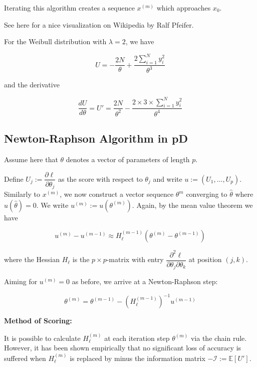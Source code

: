 \documentclass[11pt]{article}
\begin{document}
Iterating this algorithm creates a sequence \(x^{(m)}\) which approaches \(x_0\).

See here for a nice visualization on Wikipedia by Ralf Pfeifer.

For the Weibull distribution with \(\lambda = 2\), we have

\begin{equation}
    U = -\dfrac{2N}{\theta} + \dfrac{2 \sum_{i=1}^{N} y_i^2}{\theta^3}
\end{equation}

and the derivative

\begin{equation}
    \dfrac{dU}{d\theta} = U' = \dfrac{2N}{\theta^2} - \frac{2 \times 3 \times \sum_{i=1}^{N} y_i^2}{\theta^4}
\end{equation}

\subsection{Newton-Raphson Algorithm in pD}

Assume here that \(\theta\) denotes a vector of parameters of length \(p\).

Define \(U_j := \dfrac{\partial \ell}{\partial \theta_j}\) as the score with respect to \(\theta_j\) and write \(u := (U_1, \ldots, U_p) \). Similarly to \(x^{(m)}\), we now construct a vector sequence $\theta^m$ converging to \(\hat{\theta}\) where \(u(\hat{\theta})=0\). We write \(u^{(m)} := u(\theta^{(m)})\). Again, by the mean value theorem we have

\begin{equation}
    u^{(m)} - u^{(m-1)} \approx H_{\ell}^{(m-1)} (\theta^{(m)} - \theta^{(m-1)})
\end{equation}

where the Hessian $H_{\ell}$ is the \( p \times p \)-matrix with entry \( \dfrac{\partial^2 \ell}{\partial \theta_j \partial\theta_k}\) at position \( (j, k) \).

Aiming for \(u^{(m)} = 0\) as before, we arrive at a Newton-Raphson step:

\begin{equation}
    \theta^{(m)} = \theta^{(m-1)} - (H_{\ell}^{(m-1)})^{-1} u^{(m-1)}
\end{equation}

\textbf{Method of Scoring:}

It is possible to calculate \(H_{\ell}^{(m)}\) at each iteration step $\theta^{(m)}$ via the chain rule. However, it has been shown empirically that no significant loss of accuracy is suffered when \(H_{\ell}^{(m)}\) is replaced by minus the information matrix \(-\mathcal{I} := \mathbb{E}[U']\).
\end{document}
